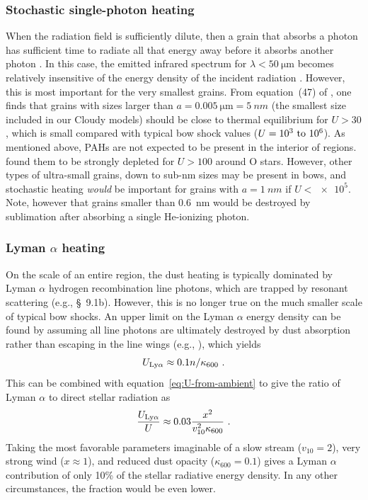 \subsubsection{Stochastic single-photon heating}
\label{sec:stoch-single-phot}
When the radiation field is sufficiently dilute, then a grain that
absorbs a photon has sufficient time to radiate all that energy away
before it absorbs another photon \citep{Duley:1973a}.  In this case,
the emitted infrared spectrum for \(\lambda < \SI{50}{\um}\) becomes
relatively insensitive of the energy density of the incident radiation
\citep{Draine:2001a}.  However, this is most important for the very
smallest grains.  From equation~(47) of \citet{Draine:2001a}, one
finds that grains with sizes larger than
\(a = \SI{0.005}{\um} = \SI{5}{nm}\) (the smallest size included in
our Cloudy models) should be close to thermal equilibrium for
\(U > 30\), which is small compared with typical bow shock values
(\(U = \text{\numrange{e3}{e6}}\)).  As mentioned above, PAHs are not
expected to be present in the interior of \hii{} regions.
\citealp{Desert:1990a} found them to be strongly depleted for
\(U > 100\) around O stars.  However, other types of ultra-small
grains, down to sub-nm sizes \citep{Xie:2018a} may be present in bows,
and stochastic heating \emph{would} be important for grains with
\(a = \SI{1}{nm}\) if \(U < \num{e5}\).  Note, however that grains
smaller than \SI{0.6}{nm} would be destroyed by sublimation after
absorbing a single He-ionizing photon.


\subsubsection{Lyman \(\alpha\) heating}

On the scale of an entire \hii{} region, the dust heating is typically
dominated by Lyman \(\alpha\) hydrogen recombination line photons, which
are trapped by resonant scattering (e.g., \citealp{Spitzer:1978a}
\S~9.1b).  However, this is no longer true on the much smaller scale
of typical bow shocks.  An upper limit on the Lyman \(\alpha\) energy
density can be found by assuming all line photons are ultimately
destroyed by dust absorption rather than escaping in the line wings
(e.g., \citealp{Henney:1998b}), which yields
\begin{equation}
  \label{eq:U-Lya}
  U_{\text{Ly}\alpha} \approx 0.1 n / \kappa_{600} \ .
\end{equation}
This can be combined with equation~\eqref{eq:U-from-ambient} to give
the ratio of Lyman \(\alpha\) to direct stellar radiation as
\begin{equation}
  \label{eq:Lya-over-stellar}
  \frac{U\Lya}{U} \approx 0.03 \frac{x^2}{v_{10}^2 \kappa_{600}} \ .
\end{equation}
Taking the most favorable parameters imaginable of a slow stream
(\(v_{10} = 2\)), very strong wind (\(x \approx 1\)), and reduced dust
opacity (\(\kappa_{600} = 0.1\)) gives a Lyman \(\alpha\) contribution of only
10\% of the stellar radiative energy density.  In any other
circumstances, the fraction would be even lower.

